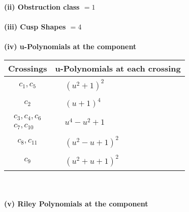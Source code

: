 \documentclass[1p]{elsarticle_modified}
\theoremstyle{definition}
\begin{document}
\flushleft \textbf{(ii) Obstruction class $= 1$}\\~\\
\flushleft \textbf{(iii) Cusp Shapes $= 4$}\\~\\
\newpage\renewcommand{\arraystretch}{1}
\flushleft \textbf{(iv) u-Polynomials at the component}\newline \\
\begin{tabular}{m{50pt}|m{274pt}}
Crossings & \hspace{64pt}u-Polynomials at each crossing \\
\hline $$\begin{aligned}c_{1},c_{5}\end{aligned}$$&$\begin{aligned}
&(u^2+1)^2
\end{aligned}$\\
\hline $$\begin{aligned}c_{2}\end{aligned}$$&$\begin{aligned}
&(u+1)^4
\end{aligned}$\\
\hline $$\begin{aligned}c_{3},c_{4},c_{6}\\c_{7},c_{10}\end{aligned}$$&$\begin{aligned}
&u^4- u^2+1
\end{aligned}$\\
\hline $$\begin{aligned}c_{8},c_{11}\end{aligned}$$&$\begin{aligned}
&(u^2- u+1)^2
\end{aligned}$\\
\hline $$\begin{aligned}c_{9}\end{aligned}$$&$\begin{aligned}
&(u^2+u+1)^2
\end{aligned}$\\
\hline
\end{tabular}\\~\\
\newpage\renewcommand{\arraystretch}{1}
\flushleft \textbf{(v) Riley Polynomials at the component}\newline \\
\end{document}
